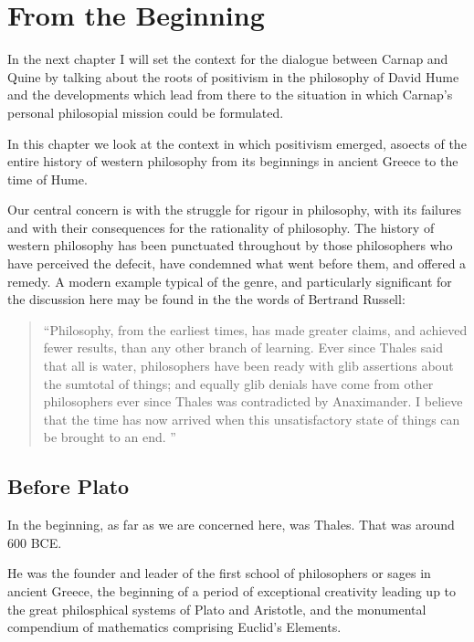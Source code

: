\chapter{From the Beginning}

In the next chapter I will set the context for the dialogue between Carnap and Quine by talking about the roots of positivism in the philosophy of David Hume and the developments which lead from there to the situation in which Carnap's personal philosopial mission could be formulated.

In this chapter we look at the context in which positivism emerged, asoects of the entire history of western philosophy from its beginnings in ancient Greece to the time of Hume.

Our central concern is with the struggle for rigour in philosophy, with its failures and with their consequences for the rationality of philosophy.
The history of western philosophy has been punctuated throughout by those philosophers who have perceived the defecit, have condemned what went before them, and offered a remedy.
A modern example typical of the genre, and particularly significant for the discussion here may be found in the the words of Bertrand Russell:

\begin{quote}

``Philosophy, from the earliest times, has made greater claims, and achieved
fewer results, than any other branch of learning. Ever since Thales said that
all is water, philosophers have been ready with glib assertions about the sumtotal
of things; and equally glib denials have come from other philosophers ever
since Thales was contradicted by Anaximander.
I believe that the time has
now arrived when this unsatisfactory state of things can be brought to an end.
''
\end{quote}


\section{Before Plato}

In the beginning, as far as we are concerned here, was Thales.
That was around 600 BCE.

He was the founder and leader of the first school of philosophers or sages in ancient Greece, the beginning of a period of exceptional creativity leading up to the great philosphical systems of Plato and Aristotle, and the monumental compendium of mathematics comprising Euclid's Elements.

